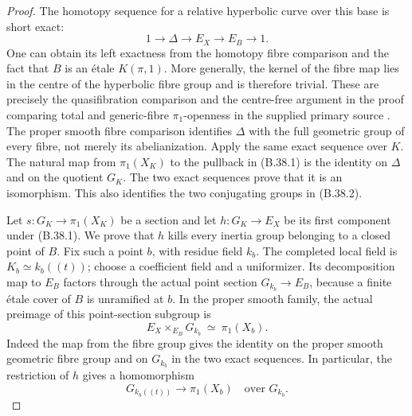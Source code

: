 \begin{proof}
The homotopy sequence for a relative hyperbolic curve
over this base is short exact:
\[
 1\longrightarrow\Delta\longrightarrow E_X
       \longrightarrow E_B\longrightarrow1.
 \tag{B.38.4}
\]
One can obtain its left exactness from the homotopy
fibre comparison and the fact that $B$ is an \'etale
$K(\pi,1)$. More generally, the kernel of the fibre
map lies in the centre of the hyperbolic fibre group
and is therefore trivial. These are precisely the
quasifibration comparison and the centre-free argument
in the proof comparing total and generic-fibre
$\pi_1$-openness in the supplied primary source
\cite{F-HolzschuhSchmidtStix}. The proper smooth fibre
comparison identifies $\Delta$ with the full geometric
group of every fibre, not merely its abelianization.
Apply the same exact sequence over $K$. The natural
map from $\pi_1(X_K)$ to the pullback in (B.38.1)
is the identity on $\Delta$ and on the quotient
$G_K$. The two exact sequences prove that it is an
isomorphism. This also identifies the two conjugating
groups in (B.38.2).

Let $s:G_K\to\pi_1(X_K)$ be a section and let
$h:G_K\to E_X$ be its first component under (B.38.1).
We prove that $h$ kills every inertia group belonging
to a closed point of $B$. Fix such a point $b$, with
residue field $k_b$. The completed local field is
$K_b\simeq k_b((t))$; choose a coefficient field and
a uniformizer. Its decomposition map to $E_B$
factors through the actual point section
$G_{k_b}\to E_B$, because a finite \'etale cover of
$B$ is unramified at $b$. In the proper smooth family,
the actual preimage of this point-section subgroup is
\[
 E_X\times_{E_B}G_{k_b}\ \simeq\ \pi_1(X_b).
 \tag{B.38.5}
\]
Indeed the map from the fibre group gives the identity
on the proper smooth geometric fibre group and on
$G_{k_b}$ in the two exact sequences. In particular,
the restriction of $h$ gives a homomorphism
\[
 G_{k_b((t))}\longrightarrow\pi_1(X_b)
                 \quad\text{over }G_{k_b}.
 \tag{B.38.6}
\]


\end{proof}
